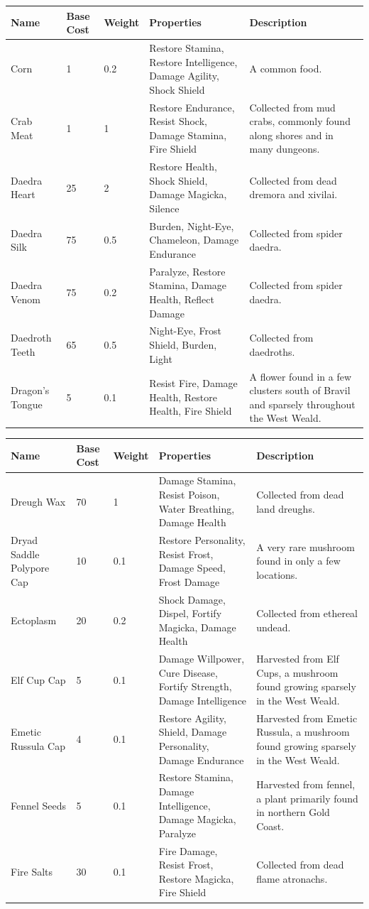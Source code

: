 \documentclass[12pt]{book}
\begin{document}
\begin{tabular}{|p{}|p{}|p{}|p{}|p{}|}
\hline
Name & Base Cost & Weight & Properties & Description\\ \hline
Corn & 1 & 0.2 & Restore Stamina, Restore Intelligence, Damage Agility, Shock Shield & A common food.\\ \hline
Crab Meat & 1 & 1 & Restore Endurance, Resist Shock, Damage Stamina, Fire Shield & Collected from mud crabs, commonly found along shores and in many dungeons.\\ \hline
Daedra Heart & 25 & 2 & Restore Health, Shock Shield, Damage Magicka, Silence & Collected from dead dremora and xivilai.\\ \hline
Daedra Silk & 75 & 0.5 & Burden, Night-Eye, Chameleon, Damage Endurance & Collected from spider daedra.\\ \hline
Daedra Venom & 75 & 0.2 & Paralyze, Restore Stamina, Damage Health, Reflect Damage & Collected from spider daedra.\\ \hline
Daedroth Teeth & 65 & 0.5 & Night-Eye, Frost Shield, Burden, Light & Collected from daedroths.\\ \hline
Dragon's Tongue & 5 & 0.1 & Resist Fire, Damage Health, Restore Health, Fire Shield & A flower found in a few clusters south of Bravil and sparsely throughout the West Weald.\\ \hline
\end{tabular}

\begin{tabular}{|p{}|p{}|p{}|p{}|p{}|}
\hline
Name & Base Cost & Weight & Properties & Description\\ \hline
Dreugh Wax & 70 & 1 & Damage Stamina, Resist Poison, Water Breathing, Damage Health & Collected from dead land dreughs.\\ \hline
Dryad Saddle Polypore Cap & 10 & 0.1 & Restore Personality, Resist Frost, Damage Speed, Frost Damage & A very rare mushroom found in only a few locations.\\ \hline
Ectoplasm & 20 & 0.2 & Shock Damage, Dispel, Fortify Magicka, Damage Health & Collected from ethereal undead.\\ \hline
Elf Cup Cap & 5 & 0.1 & Damage Willpower, Cure Disease, Fortify Strength, Damage Intelligence & Harvested from Elf Cups, a mushroom found growing sparsely in the West Weald.\\ \hline
Emetic Russula Cap & 4 & 0.1 & Restore Agility, Shield, Damage Personality, Damage Endurance & Harvested from Emetic Russula, a mushroom found growing sparsely in the West Weald.\\ \hline
Fennel Seeds & 5 & 0.1 & Restore Stamina, Damage Intelligence, Damage Magicka, Paralyze & Harvested from fennel, a plant primarily found in northern Gold Coast.\\ \hline
Fire Salts & 30 & 0.1 & Fire Damage, Resist Frost, Restore Magicka, Fire Shield & Collected from dead flame atronachs.\\ \hline
\end{tabular}
\end{document}
